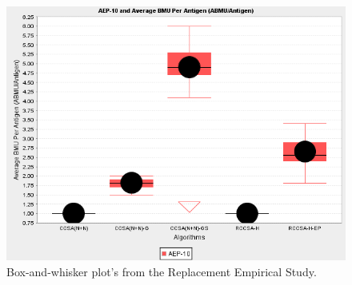 \begin{figure}[htp]
{	\label{fig:tissues:ccsa:rccsa:abmca:boxplot} %
	\begin{minipage}[t]{\textwidth}
		\centering \includegraphics[scale=0.40]{Cells/CCSA-Study2-ABMCA}
	\end{minipage}}%
	\caption{Box-and-whisker plot's from the Replacement Empirical Study.}
	\label{fig:tissues:rccsa::study2:all:boxplot} %
\end{figure}

